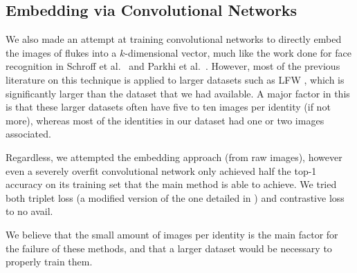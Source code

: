 \subsection{Embedding via Convolutional Networks}

We also made an attempt at training convolutional networks to directly embed the images of flukes into a $k$-dimensional vector, much like the work done for face recognition in Schroff et al.\ \cite{schroff2015facenet} and Parkhi et al.\ \cite{parkhi2015deep}.
However, most of the previous literature on this technique is applied to larger datasets such as LFW \cite{huang2007labeled}, which is significantly larger than the dataset that we had available.
A major factor in this is that these larger datasets often have five to ten images per identity (if not more), whereas most of the identities in our dataset had one or two images associated.

Regardless, we attempted the embedding approach (from raw images), however even a severely overfit convolutional network only achieved half the top-1 accuracy on its training set that the main method is able to achieve.
We tried both triplet loss (a modified version of the one detailed in \cite{schroff2015facenet}) and contrastive loss \cite{hadsell2006dimensionality} to no avail.

We believe that the small amount of images per identity is the main factor for the failure of these methods, and that a larger dataset would be necessary to properly train them.

